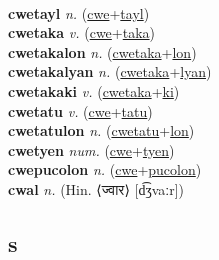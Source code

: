  \label{cwekuhokilial} \\
\textbf{cwetayl} \textit{n.} (\hyperref[cwe]{cwe}+\hyperref[tayl]{tayl})
 \label{cwetayl} \\
\textbf{cwetaka} \textit{v.} (\hyperref[cwe]{cwe}+\hyperref[taka]{taka})
 \label{cwetaka} \\
\textbf{cwetakalon} \textit{n.} (\hyperref[cwetaka]{cwetaka}+\hyperref[lon]{lon})
 \label{cwetakalon} \\
\textbf{cwetakalyan} \textit{n.} (\hyperref[cwetaka]{cwetaka}+\hyperref[lyan]{lyan})
 \label{cwetakalyan} \\
\textbf{cwetakaki} \textit{v.} (\hyperref[cwetaka]{cwetaka}+\hyperref[ki]{ki})
 \label{cwetakaki} \\
\textbf{cwetatu} \textit{v.} (\hyperref[cwe]{cwe}+\hyperref[tatu]{tatu})
 \label{cwetatu} \\
\textbf{cwetatulon} \textit{n.} (\hyperref[cwetatu]{cwetatu}+\hyperref[lon]{lon})
 \label{cwetatulon} \\
\textbf{cwetyen} \textit{num.} (\hyperref[cwe]{cwe}+\hyperref[tyen]{tyen})
 \label{cwetyen} \\
\textbf{cwepucolon} \textit{n.} (\hyperref[cwe]{cwe}+\hyperref[pucolon]{pucolon})
 \label{cwepucolon} \\
\textbf{cwal} \textit{n.} (Hin. ⟨ज्वार⟩ [d͡ʒvaːr])
 \label{cwal} \\
\subsection{s}

